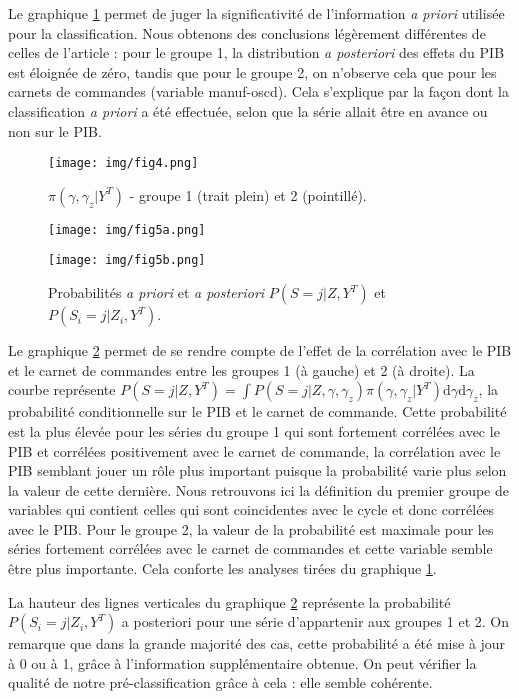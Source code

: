 \documentclass[10pt,french,french]{article}
\begin{document}
Le graphique \ref{pi-gamma} permet de juger la significativité de l'information \emph{a priori} utilisée pour la classification.
Nous obtenons des conclusions légèrement différentes de celles de l'article : pour le groupe 1, la distribution \emph{a posteriori} des effets du PIB est éloignée de zéro, tandis que pour le groupe 2, on n'observe cela que pour les carnets de commandes (variable manuf-oscd).
Cela s'explique par la façon dont la classification \emph{a priori} a été effectuée, selon que la série allait être en avance ou non sur le PIB.

\begin{figure}
\centering
\texttt{[image: img/fig4.png]}
\caption{$\pi(\gamma,\gamma_z|Y^T)$ - groupe 1 (trait plein) et 2 (pointillé).}
\label{pi-gamma}
\end{figure}

\begin{figure}
\begin{minipage}{.5\textwidth}
\texttt{[image: img/fig5a.png]}
\end{minipage}
\hfill
\begin{minipage}{.5\textwidth}
\texttt{[image: img/fig5b.png]}
\end{minipage}
\caption{Probabilités \textit{a priori} et \textit{a posteriori} $P(S = j|Z,Y^T)$ et $P(S_i = j|Z_i,Y^T)$.}
\label{graph3d}
\end{figure}

Le graphique \ref{graph3d} permet de se rendre compte de l'effet de la corrélation avec le PIB et le carnet de commandes entre les groupes 1 (à gauche) et 2 (à droite).
La courbe représente \(P(S = j|Z,Y^T) = \int P(S=j|Z,\gamma,\gamma_z)\pi(\gamma,\gamma_z|Y^T)\mathrm{d}\gamma\mathrm{d}\gamma_z\), la probabilité conditionnelle sur le PIB et le carnet de commande.
Cette probabilité est la plus élevée pour les séries du groupe 1 qui sont fortement corrélées avec le PIB et corrélées positivement avec le carnet de commande, la corrélation avec le PIB semblant jouer un rôle plus important puisque la probabilité varie plus selon la valeur de cette dernière.
Nous retrouvons ici la définition du premier groupe de variables qui contient celles qui sont coincidentes avec le cycle et donc corrélées avec le PIB.
Pour le groupe 2, la valeur de la probabilité est maximale pour les séries fortement corrélées avec le carnet de commandes et cette variable semble être plus importante.
Cela conforte les analyses tirées du graphique \ref{pi-gamma}.

La hauteur des lignes verticales du graphique \ref{graph3d} représente la probabilité \(P(S_i = j|Z_i,Y^T)\) a posteriori pour une série d'appartenir aux groupes 1 et 2.
On remarque que dans la grande majorité des cas, cette probabilité a été mise à jour à 0 ou à 1, grâce à l'information supplémentaire obtenue.
On peut vérifier la qualité de notre pré-classification grâce à cela : elle semble cohérente.
\end{document}
